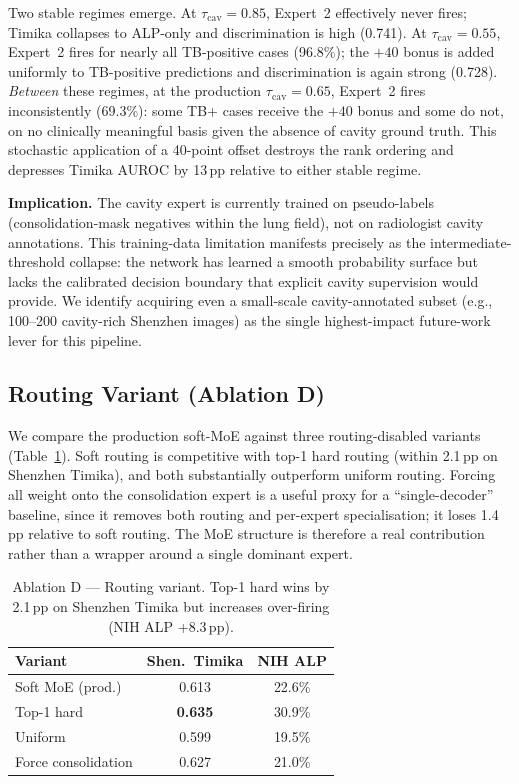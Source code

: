 \documentclass{article}
\begin{document}
Two stable regimes emerge. At $\tau_{\text{cav}} = 0.85$, Expert~2 effectively never fires; Timika collapses to ALP-only and discrimination is high (0.741). At $\tau_{\text{cav}} = 0.55$, Expert~2 fires for nearly all TB-positive cases (96.8\%); the $+40$ bonus is added uniformly to TB-positive predictions and discrimination is again strong (0.728). \emph{Between} these regimes, at the production $\tau_{\text{cav}} = 0.65$, Expert~2 fires inconsistently (69.3\%): some TB+ cases receive the $+40$ bonus and some do not, on no clinically meaningful basis given the absence of cavity ground truth. This stochastic application of a 40-point offset destroys the rank ordering and depresses Timika AUROC by 13\,pp relative to either stable regime.

\textbf{Implication.} The cavity expert is currently trained on pseudo-labels (consolidation-mask negatives within the lung field), not on radiologist cavity annotations. This training-data limitation manifests precisely as the intermediate-threshold collapse: the network has learned a smooth probability surface but lacks the calibrated decision boundary that explicit cavity supervision would provide. We identify acquiring even a small-scale cavity-annotated subset (e.g., 100--200 cavity-rich Shenzhen images) as the single highest-impact future-work lever for this pipeline.

\subsection{Routing Variant (Ablation D)}
\label{sec:abl_D}

We compare the production soft-MoE against three routing-disabled variants (Table~\ref{tab:abl_routing}). Soft routing is competitive with top-1 hard routing (within 2.1\,pp on Shenzhen Timika), and both substantially outperform uniform routing. Forcing all weight onto the consolidation expert is a useful proxy for a ``single-decoder'' baseline, since it removes both routing and per-expert specialisation; it loses 1.4\,pp relative to soft routing. The MoE structure is therefore a real contribution rather than a wrapper around a single dominant expert.

\begin{table}[t]
\caption{Ablation D --- Routing variant. Top-1 hard wins by 2.1\,pp on Shenzhen Timika but increases over-firing (NIH ALP +8.3\,pp).}
\label{tab:abl_routing}
\vskip 0.1in
\centering
\small
\begin{tabular}{lcc}
\toprule
Variant & Shen.\ Timika & NIH ALP \\
\midrule
Soft MoE (prod.) & 0.613 & 22.6\% \\
Top-1 hard & \textbf{0.635} & 30.9\% \\
Uniform & 0.599 & 19.5\% \\
Force consolidation & 0.627 & 21.0\% \\
\bottomrule
\end{tabular}
\end{table}
\end{document}
